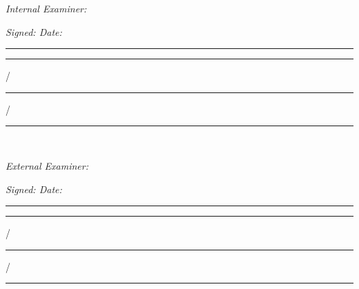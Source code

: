 \documentclass[
12pt, %
oneside, %
english, %
onehalfspacing, %
nolistspacing, %
liststotoc, %
parskip, %
headsepline, %
consistentlayout, %
]{MastersDoctoralThesis} %
\begin{document}
\begin{center}
\begin{minipage}[t]{0.5\textwidth}
\begin{flushleft} \large
\emph{Internal Examiner:}\\[0.1cm] 
\examname 
\end{flushleft}
\end{minipage}
\begin{minipage}[t]{0.4\textwidth}
\begin{flushright} \large
\emph{Signed: \hspace{4em} Date: } \\[0.1cm]
\rule[0em]{4em}{0.5pt} \hspace{1em} \rule[0em]{1em}{0.5pt} / \rule[0em]{1em}{0.5pt} / \rule[0em]{2em}{0.5pt}
\end{flushright}
\end{minipage}\\[1cm]
 
\begin{minipage}[t]{0.5\textwidth}
\begin{flushleft} \large
\emph{External Examiner:}\\[0.1cm]
\examname 
\end{flushleft}
\end{minipage}
\begin{minipage}[t]{0.4\textwidth}
\begin{flushright} \large
\emph{Signed: \hspace{4em} Date: } \\[0.1cm]
\rule[0em]{4em}{0.5pt} \hspace{1em} \rule[0em]{1em}{0.5pt} / \rule[0em]{1em}{0.5pt} / \rule[0em]{2em}{0.5pt}
\end{flushright}
\end{minipage}
\end{center}


\pagebreak
{}
\cleardoublepage
\end{document}
